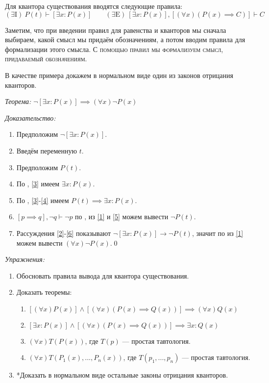 Для квантора существования вводятся следующие правила:
\[
	(\exists\text{I})~ P(t)\vdash [\exists x:P(x)]\qquad
	(\exists\text{E})~ [\exists x:P(x)],[(\forall x)(P(x)\implies C)]\vdash C
\]

Заметим, что при введении правил для равенства и кванторов мы
сначала выбираем, какой смысл мы придаём обозначениям, а потом вводим
правила для формализации этого смысла.
\textsc{С помощью правил мы формализуем смысл, придаваемый обозначениям.}

В качестве примера докажем в нормальном виде один из законов отрицания кванторов.

{\it Теорема:} $\lnot [\exists x:P(x)]\implies  (\forall x)\lnot P(x)$

{\it Доказательство:}
\begin{enumerate}[label=(\arabic*)]
	\item{}\label{1}Предположим $\lnot [\exists x:P(x)]$.
	\item{}\label{2}Введём переменную $t$.
	\item{}\label{3}Предположим $P(t)$.
	\item{}\label{4}По \Eii{}, \ref{3} имеем $\exists x:P(x)$.
	\item{}\label{5}По \implic{}, \ref{3}-\ref{4} имеем $P(t)\implies \exists x:P(x)$.
	\item{}\label{6}${[p\implies q],\lnot q\vdash \lnot p}$ по \taut{}, из
	\ref{1} и \ref{5} можем вывести $\lnot P(t)$.
	\item{}\label{7}Рассуждения \ref{2}-\ref{6} показывают
	$\lnot[\exists x:P(x)]\to\lnot P(t)$, значит по \Aii{} из \ref{1} можем
	вывести $(\forall x)\lnot P(x)$.\qed
\end{enumerate}

{\it Упражнения:}
\begin{enumerate}
	\item{}Обосновать правила вывода для квантора существования.
	\item{}Доказать теоремы:
	\begin{enumerate}
		\item{}$[(\forall x)P(x)]\land[(\forall x)(P(x)\implies Q(x))]
			\implies (\forall x)Q(x)$\label{thm:obv_forall}
		\item{}$[\exists x:P(x)]\land[(\forall x)(P(x)\implies Q(x))]
			\implies \exists x:Q(x)$
		\item{}$(\forall x)T(P(x))$, где $T(p)$ --- простая тавтология.\label{thm:obv_taut}
		\item{}$(\forall x)T(P_1(x),...,P_{n}(x))$, где $T(p_1,...,p_{n})$ ---
		простая тавтология.
	\end{enumerate}
	\item{}*Доказать в нормальном виде остальные законы отрицания кванторов.
\end{enumerate}


